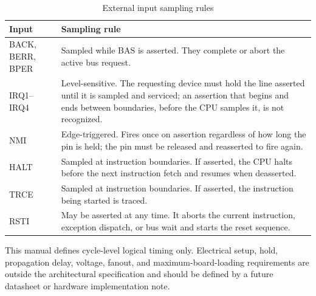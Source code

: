 \begin{table}[H]
	\centering
	\small
	\begin{tabularx}{\textwidth}{lX}
		\toprule
		\textbf{Input}   & \textbf{Sampling rule}                                                                                                                                                                                   \\
		\midrule
		BACK, BERR, BPER & Sampled while BAS is asserted. They complete or abort the active bus request.                                                                                                                            \\
		IRQ1--IRQ4       & Level-sensitive. The requesting device must hold the line asserted until it is sampled and serviced; an assertion that begins and ends between boundaries, before the CPU samples it, is not recognized. \\
		NMI              & Edge-triggered. Fires once on assertion regardless of how long the pin is held; the pin must be released and reasserted to fire again.                                                                   \\
		HALT             & Sampled at instruction boundaries. If asserted, the CPU halts before the next instruction fetch and resumes when deasserted.                                                                             \\
		TRCE             & Sampled at instruction boundaries. If asserted, the instruction being started is traced.                                                                                                                 \\
		RSTI             & May be asserted at any time. It aborts the current instruction, exception dispatch, or bus wait and starts the reset sequence.                                                                           \\
		\bottomrule
	\end{tabularx}
	\caption{External input sampling rules}
	\label{tab:external-input-sampling-rules}
\end{table}

This manual defines cycle-level logical timing only. Electrical setup, hold, propagation delay, voltage, fanout, and
maximum-board-loading requirements are outside the architectural specification and should be defined by a future
datasheet or hardware implementation note.
